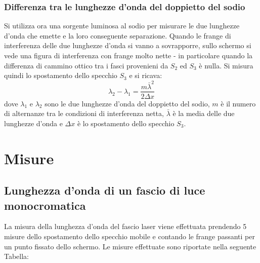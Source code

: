 \documentclass[]{article}
\let\oldsection\section%
\renewcommand{\section}{%
	\renewcommand{\theequation}{\thesection.\arabic{equation}}%
	\oldsection}%
\let\oldsubsection\subsection%
\renewcommand{\subsection}{%
	\renewcommand{\theequation}{\thesubsection.\arabic{equation}}%
	\oldsubsection}%
\begin{document}
\subsubsection{Differenza tra le lunghezze d'onda del doppietto del sodio}

Si utilizza ora una sorgente luminosa al sodio per misurare le due lunghezze d'onda che emette e la loro conseguente separazione. Quando le frange di interferenza delle due lunghezze d'onda si vanno a sovrapporre, sullo schermo si vede una figura di interferenza con frange molto nette - in particolare quando la differenza di cammino ottico tra i fasci provenieni da $S_2$ ed $S_3$ è nulla. 
Si misura quindi lo spostamento dello specchio $S_3$ e si ricava:
\begin{equation}
    \label{Delta_lambda}
    \lambda _2 - \lambda _1 = \frac {m \bar{\lambda} ^2 }{2 \Delta x}
\end{equation}
dove $\lambda _1$ e $\lambda _2$ sono le due lunghezze d'onda del doppietto del sodio, $m$ è il numero di alternanze tra le condizioni di interferenza netta, $\bar{\lambda}$ è la media delle due lunghezze d'onda e $\Delta x$ è lo spostamento dello specchio $S_3$.

\section{Misure}

\subsection {Lunghezza d'onda di un fascio di luce monocromatica}

La misura della lunghezza d'onda del fascio laser viene effettuata prendendo 5 misure dello spostamento dello specchio mobile e contando le frange passanti per un punto fissato dello schermo. Le misure effettuate sono riportate nella seguente Tabella:
\end{document}
